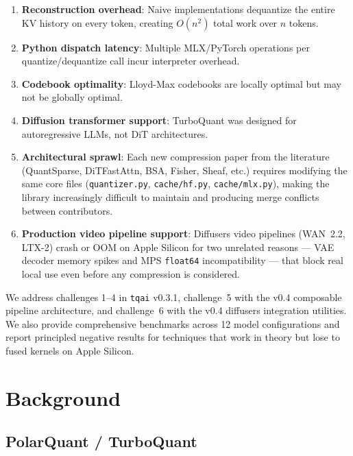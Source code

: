 \documentclass[11pt,a4paper]{article}
\begin{document}
\begin{enumerate}[label=\arabic*.]
  \item \textbf{Reconstruction overhead}: Naive implementations dequantize the entire KV history on every token, creating $O(n^2)$ total work over $n$ tokens.
  \item \textbf{Python dispatch latency}: Multiple MLX/PyTorch operations per quantize/dequantize call incur interpreter overhead.
  \item \textbf{Codebook optimality}: Lloyd-Max codebooks are locally optimal but may not be globally optimal.
  \item \textbf{Diffusion transformer support}: TurboQuant was designed for autoregressive LLMs, not DiT architectures.
  \item \textbf{Architectural sprawl}: Each new compression paper from the literature (QuantSparse, DiTFastAttn, BSA, Fisher, Sheaf, etc.) requires modifying the same core files (\texttt{quantizer.py}, \texttt{cache/hf.py}, \texttt{cache/mlx.py}), making the library increasingly difficult to maintain and producing merge conflicts between contributors.
  \item \textbf{Production video pipeline support}: Diffusers video pipelines (WAN~2.2, LTX-2) crash or OOM on Apple Silicon for two unrelated reasons --- VAE decoder memory spikes and MPS \texttt{float64} incompatibility --- that block real local use even before any compression is considered.
\end{enumerate}

We address challenges 1--4 in \texttt{tqai} v0.3.1, challenge~5 with the v0.4 composable pipeline architecture, and challenge~6 with the v0.4 diffusers integration utilities. We also provide comprehensive benchmarks across 12 model configurations and report principled negative results for techniques that work in theory but lose to fused kernels on Apple Silicon.

\section{Background}

\subsection{PolarQuant / TurboQuant}
\end{document}
